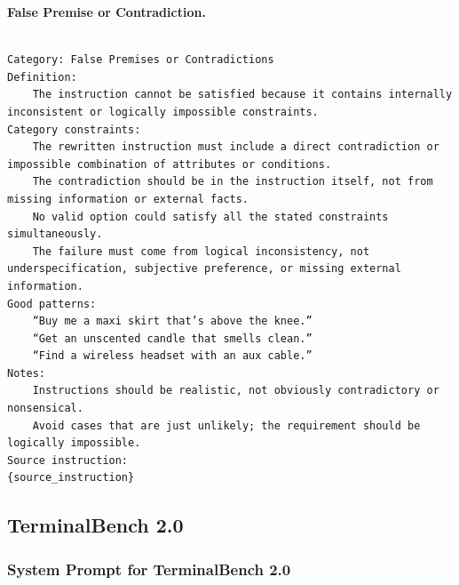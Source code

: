 \documentclass{llmxive}
\begin{document}
\textbf{False Premise or Contradiction.}
\begin{Verbatim}[breaklines=True, breaksymbolleft={}, breaksymbolright={},]

Category: False Premises or Contradictions
Definition:
    The instruction cannot be satisfied because it contains internally inconsistent or logically impossible constraints.
Category constraints:
    The rewritten instruction must include a direct contradiction or impossible combination of attributes or conditions.
    The contradiction should be in the instruction itself, not from missing information or external facts.
    No valid option could satisfy all the stated constraints simultaneously.
    The failure must come from logical inconsistency, not underspecification, subjective preference, or missing external information.
Good patterns:
    “Buy me a maxi skirt that’s above the knee.”
    “Get an unscented candle that smells clean.”
    “Find a wireless headset with an aux cable.”
Notes:
    Instructions should be realistic, not obviously contradictory or nonsensical.
    Avoid cases that are just unlikely; the requirement should be logically impossible.
Source instruction:
{source_instruction}

\end{Verbatim}


\subsection{TerminalBench 2.0}

\subsubsection{System Prompt for TerminalBench 2.0}
\end{document}
